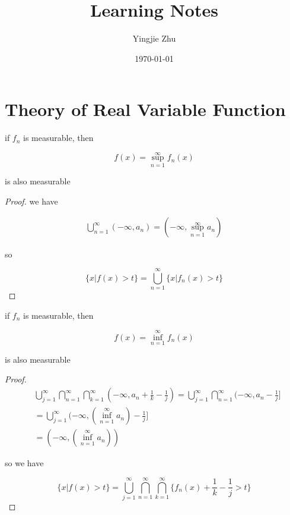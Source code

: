 \documentclass[11pt,a4paper]{article}
\title{Learning Notes}
\author{Yingjie Zhu}
\date{\today}
\begin{document}
\maketitle

\section{Theory of Real Variable Function}

\begin{exercise}
    if $f_n$ is measurable, then 

    \[
        f(x) = \sup_{n=1}^{\infty}f_n(x)
    \]

    is also measurable
\end{exercise}

\begin{proof}
   we have 
   
   \begin{align*}
        \bigcup_{n=1}^{\infty}(-\infty, a_n) = (-\infty, \sup_{n=1}^{\infty}a_n)
   \end{align*}

   so 

   \[
    \{ x \vert f(x) > t \} = \bigcup_{n=1}^{\infty} \{ x \vert f_n(x) >  t\}
   \]
\end{proof}

\begin{exercise}
    if $f_n$ is measurable, then 

    \[
        f(x) = \inf_{n=1}^{\infty}f_n(x)
    \]

    is also measurable
\end{exercise}

\begin{proof}
    
\begin{align*}
    & \bigcup_{j=1}^{\infty}\bigcap_{n=1}^{\infty}\bigcap_{k=1}^{\infty}(-\infty, a_n + \frac{1}{k} - \frac{1}{j}) = \bigcup_{j=1}^{\infty}\bigcap_{n=1}^{\infty}(-\infty, a_n  - \frac{1}{j}] \\
    & = \bigcup_{j=1}^{\infty}(-\infty, \left( \inf_{n=1}^{\infty}a_n \right)  - \frac{1}{j}] \\
    & = (-\infty, \left( \inf_{n=1}^{\infty}a_n \right))
\end{align*}

so we have

\[
    \{ x \vert f(x) > t \} = \bigcup_{j=1}^{\infty}\bigcap_{n=1}^{\infty}\bigcap_{k=1}^{\infty} \{ f_n(x) + \frac{1}{k} - \frac{1}{j} > t \}
\]

\end{proof}
\end{document}
